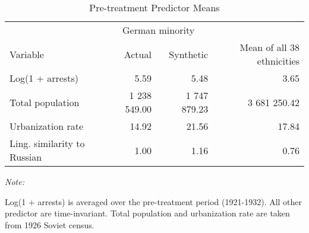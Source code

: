 \begin{table}[!h]

\caption{\label{tab:sc_predictor_means_robustness}Pre-treatment Predictor Means}
\centering
\begin{threeparttable}
\begin{tabular}{lrrr}
\toprule
\multicolumn{1}{c}{ } & \multicolumn{2}{c}{German minority} \\
\cmidrule(l{2pt}r{2pt}){2-3}
Variable & Actual & Synthetic & Mean of all 38 ethnicities\\
\midrule
Log(1 + arrests) & 5.59 & 5.48 & 3.65\\
Total population & 1 238 549.00 & 1 747 879.23 & 3 681 250.42\\
Urbanization rate & 14.92 & 21.56 & 17.84\\
Ling. similarity to Russian & 1.00 & 1.16 & 0.76\\
\bottomrule
\end{tabular}
\begin{tablenotes}
\item \textit{Note: } 
\item Log(1 + arrests) is averaged over the pre-treatment period (1921-1932). All other predictor are time-invariant. Total population and urbanization rate are taken from 1926 Soviet census.
\end{tablenotes}
\end{threeparttable}
\end{table}